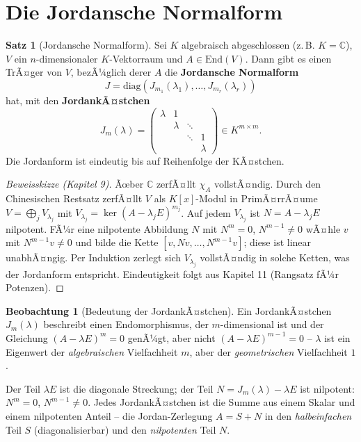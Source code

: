 ﻿\documentclass[a4paper,12pt]{report}
\theoremstyle{definition}
\newtheorem{satz}{Satz}
\newtheorem{beobachtung}{Beobachtung}
\begin{document}
\section{Die Jordansche Normalform}

\begin{satz}[Jordansche Normalform]
    Sei $K$ algebraisch abgeschlossen (z.\,B. $K = \mathbb{C}$),
    $V$ ein $n$-dimensionaler $K$-Vektorraum und $A \in \mathrm{End}(V)$.
    Dann gibt es einen TrÃ¤ger von $V$, bezÃ¼glich derer $A$ die
    \textbf{Jordansche Normalform}
    \[
        J = \mathrm{diag}(J_{m_1}(\lambda_1), \dots, J_{m_r}(\lambda_r))
    \]
    hat, mit den \textbf{JordankÃ¤stchen}
    \[
        J_m(\lambda) = \begin{pmatrix}
            \lambda & 1 & & \\
            & \lambda & \ddots & \\
            & & \ddots & 1 \\
            & & & \lambda
        \end{pmatrix} \in K^{m \times m}.
    \]
    Die Jordanform ist eindeutig bis auf Reihenfolge der KÃ¤stchen.
\end{satz}
\begin{proof}[Beweisskizze (Kapitel 9)]
    Ãœber $\mathbb{C}$ zerfÃ¤llt $\chi_A$ vollstÃ¤ndig. Durch den Chinesischen
    Restsatz zerfÃ¤llt $V$ als $K[x]$-Modul in PrimÃ¤rrÃ¤ume
    $V = \bigoplus_j V_{\lambda_j}$ mit $V_{\lambda_j} = \ker(A-\lambda_j E)^{m_j}$.
    Auf jedem $V_{\lambda_j}$ ist $N = A - \lambda_j E$ nilpotent.
    FÃ¼r eine nilpotente Abbildung $N$ mit $N^m = 0$, $N^{m-1} \neq 0$
    wÃ¤hle $v$ mit $N^{m-1}v \neq 0$ und bilde die Kette
    $[v, Nv, \ldots, N^{m-1}v]$; diese ist linear unabhÃ¤ngig.
    Per Induktion zerlegt sich $V_{\lambda_j}$ vollstÃ¤ndig in solche Ketten,
    was der Jordanform entspricht. Eindeutigkeit folgt aus Kapitel 11 (Rangsatz fÃ¼r Potenzen).
\end{proof}


\begin{beobachtung}[Bedeutung der JordankÃ¤stchen]
    Ein JordankÃ¤stchen $J_m(\lambda)$ beschreibt einen Endomorphismus,
    der $m$-dimensional ist und der Gleichung $(A - \lambda E)^m = 0$
    genÃ¼gt, aber nicht $(A - \lambda E)^{m-1} = 0$ -- $\lambda$ ist
    ein Eigenwert der \emph{algebraischen} Vielfachheit $m$, aber
    der \emph{geometrischen} Vielfachheit $1$.

    Der Teil $\lambda E$ ist die diagonale Streckung; der Teil
    $N = J_m(\lambda) - \lambda E$ ist nilpotent: $N^m = 0$, $N^{m-1} \neq 0$.
    Jedes JordankÃ¤stchen ist die Summe aus einem Skalar und einem
    nilpotenten Anteil -- die Jordan-Zerlegung $A = S + N$
    in den \emph{halbeinfachen} Teil $S$ (diagonalisierbar) und den
    \emph{nilpotenten} Teil $N$.
\end{beobachtung}
\end{document}
